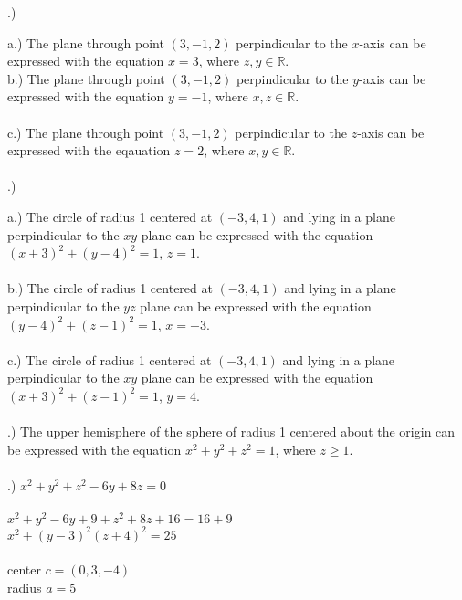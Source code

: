 \documentclass[12pt]{article}
\begin{document}
.) 


\noindent a.) The plane through point $(3, -1, 2)$ perpindicular to the  $x$-axis can be expressed with 
the equation $x = 3$, where $z,y \in \mathbb{R}$.\\

\noindent b.) The plane through point $(3, -1, 2)$ perpindicular to the $y$-axis can be expressed with
the equation $y = -1$, where $x, z \in \mathbb{R}$.\\\\
\noindent c.) The plane through point $(3, -1, 2)$ perpindicular to the $z$-axis can be expressed with 
the eqauation $z = 2$, where $x, y \in \mathbb{R}$.\\\\

.)

\noindent a.) The circle of radius 1 centered at $(- 3, 4, 1)$ and lying in a plane perpindicular to 
the $xy$ plane can be expressed with the equation $(x+3)^{2} + (y-4)^{2} = 1$, $z=1$.\\\\


\noindent b.) The circle of radius 1 centered at $(- 3, 4, 1)$ and lying in a plane perpindicular to 
the $yz$ plane can be expressed with the equation $(y-4)^{2} + (z-1)^{2} = 1$, $x=-3$.\\\\


\noindent c.) The circle of radius 1 centered at $(- 3, 4, 1)$ and lying in a plane perpindicular to 
the $xy$ plane can be expressed with the equation $(x+3)^{2} + (z-1)^{2} = 1$, $y=4$.\\\\

.) The upper hemisphere of the sphere of radius 1 centered about the origin can be expressed 
with the equation $x^{2} + y^{2} + z^{2} = 1$, where $z \geq 1$.\\\\

.) $x^{2} + y^{2} + z^{2} - 6y + 8z = 0$\\\\

\noindent $x^{2} + y^{2} - 6y + 9 + z^{2} + 8z  + 16= 16 + 9$\\
\noindent $x^{2} + (y - 3)^{2} (z + 4)^{2} = 25$\\\\

\noindent center $c = (0, 3, -4)$\\
\noindent radius $a = 5$ \pagebreak
\end{document}
